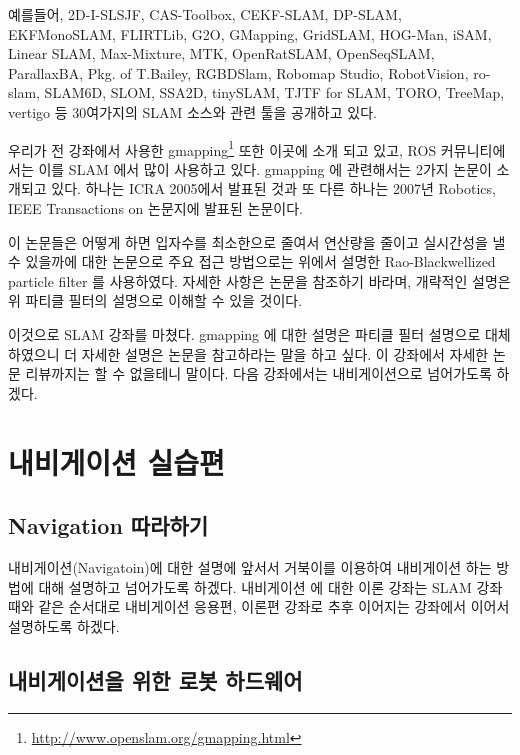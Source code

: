 예를들어, 2D-I-SLSJF, CAS-Toolbox, CEKF-SLAM, DP-SLAM, EKFMonoSLAM, FLIRTLib, G2O, GMapping, GridSLAM, HOG-Man, iSAM, Linear SLAM, Max-Mixture, MTK, OpenRatSLAM, OpenSeqSLAM, ParallaxBA, Pkg. of T.Bailey, RGBDSlam, Robomap Studio, RobotVision, ro-slam, SLAM6D, SLOM, SSA2D, tinySLAM, TJTF for SLAM, TORO, TreeMap, vertigo 등 30여가지의 SLAM 소스와 관련 툴을 공개하고 있다.

우리가 전 강좌에서 사용한 gmapping\footnote{\url{http://www.openslam.org/gmapping.html}} 또한 이곳에 소개 되고 있고, ROS 커뮤니티에서는 이를 SLAM 에서 많이 사용하고 있다. gmapping 에 관련해서는 2가지 논문\cite{grisetti2005improving}\cite{grisetti2007improved}이 소개되고 있다. 하나는 ICRA 2005에서 발표된 것과 또 다른 하나는 2007년 Robotics, IEEE Transactions on 논문지에 발표된 논문이다.

이 논문들은 어떻게 하면 입자수를 최소한으로 줄여서 연산량을 줄이고 실시간성을 낼 수 있을까에 대한 논문으로 주요 접근 방법으로는 위에서 설명한 Rao-Blackwellized particle filter 를 사용하였다. 자세한 사항은 논문을 참조하기 바라며, 개략적인 설명은 위 파티클 필터의 설명으로 이해할 수 있을 것이다.

이것으로 SLAM 강좌를 마쳤다. gmapping 에 대한 설명은 파티클 필터 설명으로 대체하였으니 더 자세한 설명은 논문을 참고하라는 말을 하고 싶다. 이 강좌에서 자세한 논문 리뷰까지는 할 수 없을테니 말이다. 다음 강좌에서는 내비게이션으로 넘어가도록 하겠다.

\section{내비게이션 실습편}
\label{sec:NavigationExe}

\subsection{Navigation 따라하기}

내비게이션(Navigatoin)에 대한 설명에 앞서서 거북이를 이용하여 내비게이션 하는 방법에 대해 설명하고 넘어가도록 하겠다. 내비게이션 에 대한 이론 강좌는 SLAM 강좌때와 같은 순서대로 내비게이션 응용편, 이론편 강좌로 추후 이어지는 강좌에서 이어서 설명하도록 하겠다.

\subsection{내비게이션을 위한 로봇 하드웨어}


